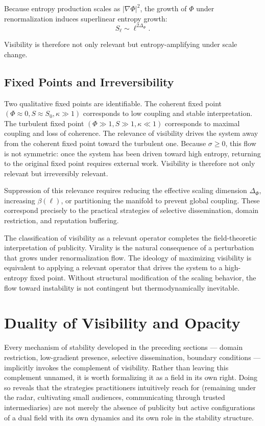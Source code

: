 \documentclass[12pt,a4paper]{article}
\begin{document}
Because entropy production scales as $|\nabla\Phi|^2$, the growth of $\Phi$ under renormalization induces superlinear entropy growth:
\[
S_\ell \sim \ell^{2\Delta_\Phi}.
\]

Visibility is therefore not only relevant but entropy-amplifying under scale change.


\subsection{Fixed Points and Irreversibility}

Two qualitative fixed points are identifiable. The coherent fixed point $(\Phi \approx 0, S \approx S_0, \kappa \gg 1)$ corresponds to low coupling and stable interpretation. The turbulent fixed point $(\Phi \gg 1, S \gg 1, \kappa \ll 1)$ corresponds to maximal coupling and loss of coherence. The relevance of visibility drives the system away from the coherent fixed point toward the turbulent one. Because $\sigma \geq 0$, this flow is not symmetric: once the system has been driven toward high entropy, returning to the original fixed point requires external work. Visibility is therefore not only relevant but irreversibly relevant.

Suppression of this relevance requires reducing the effective scaling dimension $\Delta_\Phi$, increasing $\beta(\ell)$, or partitioning the manifold to prevent global coupling. These correspond precisely to the practical strategies of selective dissemination, domain restriction, and reputation buffering.

The classification of visibility as a relevant operator completes the field-theoretic interpretation of publicity. Virality is the natural consequence of a perturbation that grows under renormalization flow. The ideology of maximizing visibility is equivalent to applying a relevant operator that drives the system to a high-entropy fixed point. Without structural modification of the scaling behavior, the flow toward instability is not contingent but thermodynamically inevitable.

\section{Duality of Visibility and Opacity}

Every mechanism of stability developed in the preceding sections — domain restriction, low-gradient presence, selective dissemination, boundary conditions — implicitly invokes the complement of visibility. Rather than leaving this complement unnamed, it is worth formalizing it as a field in its own right. Doing so reveals that the strategies practitioners intuitively reach for (remaining under the radar, cultivating small audiences, communicating through trusted intermediaries) are not merely the absence of publicity but active configurations of a dual field with its own dynamics and its own role in the stability structure.
\end{document}
